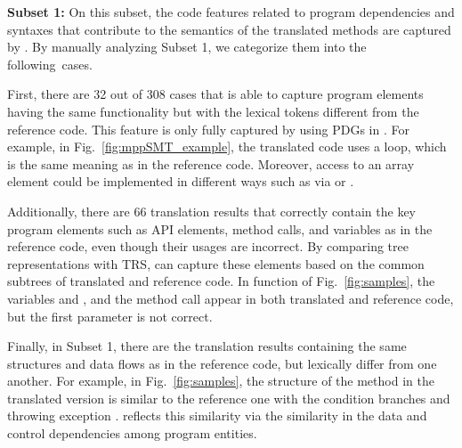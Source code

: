 

\noindent \textbf{Subset 1:} On this subset, the code features related
to program dependencies and syntaxes that contribute to the semantics
of the translated methods are captured by {\model}. By manually
analyzing Subset 1, we categorize them into the following~cases.

First, there are 32 out of 308 cases that {\model} is able to capture
program elements having the same functionality but with the lexical
tokens different from the reference code. This feature is only fully
captured by using PDGs in {\model}. For example, in
Fig.~\ref{fig:mppSMT_example}, the translated code uses a 
loop, which is the same meaning as  in the reference
code. Moreover, access to an array element could be implemented in
different ways such as via  or .
%

Additionally, there are 66 translation results that correctly contain
the key program elements such as API elements, method calls, and
variables as in the reference code, even though their usages are
incorrect. By comparing tree representations with TRS, {\model} can
capture these elements based on the common subtrees of translated and
reference code. In function  of
Fig.~\ref{fig:samples}, the variables  and
, and the method call  appear in
both translated and reference code, but the first parameter is not correct.
%

Finally, in Subset 1, there are the translation results containing the
same structures and data flows as in the reference code, but lexically
differ from one another. For example, in Fig.~\ref{fig:samples}, the
structure of the method  in the translated version is
similar to the reference one with the condition branches  and
throwing exception . {\model} reflects
this similarity via the similarity in the data and control
dependencies among program entities.


